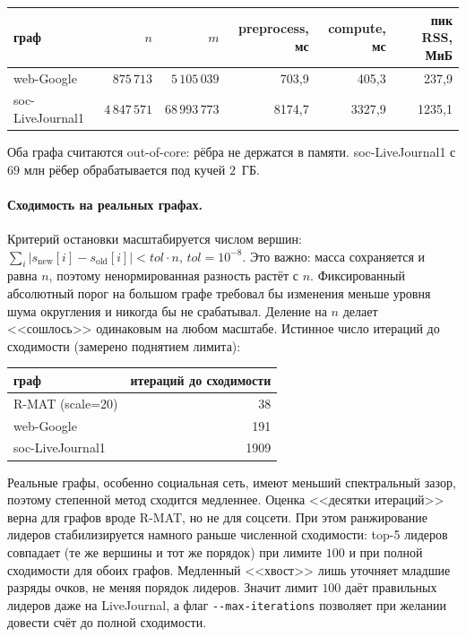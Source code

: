\begin{center}
\small
\begin{tabular}{lrrrrr}
\toprule
граф & $n$ & $m$ & preprocess, мс & compute, мс & пик RSS, МиБ\\
\midrule
web-Google        & $875\,713$   & $5\,105\,039$   & 703{,}9  & 405{,}3  & 237{,}9\\
soc-LiveJournal1  & $4\,847\,571$ & $68\,993\,773$ & 8174{,}7 & 3327{,}9 & 1235{,}1\\
\bottomrule
\end{tabular}
\end{center}

Оба графа считаются out-of-core: рёбра не держатся в памяти. soc-LiveJournal1 с $69$ млн рёбер
обрабатывается под кучей $2$~ГБ.

\paragraph{Сходимость на реальных графах.} Критерий остановки масштабируется числом вершин:
$\sum_i|s_{\mathrm{new}}[i] - s_{\mathrm{old}}[i]| < \mathit{tol}\cdot n$, $\mathit{tol}=10^{-8}$. Это
важно: масса сохраняется и равна $n$, поэтому ненормированная разность растёт с $n$. Фиксированный
абсолютный порог на большом графе требовал бы изменения меньше уровня шума округления и никогда бы не
срабатывал. Деление на $n$ делает <<сошлось>> одинаковым на любом масштабе. Истинное число итераций до
сходимости (замерено поднятием лимита):

\begin{center}
\begin{tabular}{lr}
\toprule
граф & итераций до сходимости\\
\midrule
R-MAT (scale=20)  & 38\\
web-Google        & 191\\
soc-LiveJournal1  & 1909\\
\bottomrule
\end{tabular}
\end{center}

Реальные графы, особенно социальная сеть, имеют меньший спектральный зазор, поэтому степенной метод
сходится медленнее. Оценка <<десятки итераций>> верна для графов вроде R-MAT, но не для соцсети. При
этом ранжирование лидеров стабилизируется намного раньше численной сходимости: top-5 лидеров
совпадает (те же вершины и тот же порядок) при лимите $100$ и при полной сходимости для обоих графов.
Медленный <<хвост>> лишь уточняет младшие разряды очков, не меняя порядок лидеров. Значит лимит $100$
даёт правильных лидеров даже на LiveJournal, а флаг \texttt{-{}-max-iterations} позволяет при желании
довести счёт до полной сходимости.


